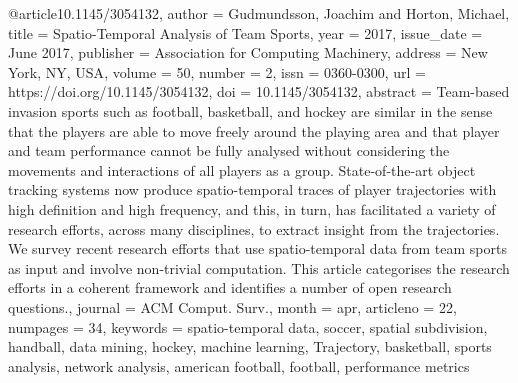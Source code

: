 @article{10.1145/3054132,
author = {Gudmundsson, Joachim and Horton, Michael},
title = {Spatio-Temporal Analysis of Team Sports},
year = {2017},
issue_date = {June 2017},
publisher = {Association for Computing Machinery},
address = {New York, NY, USA},
volume = {50},
number = {2},
issn = {0360-0300},
url = {https://doi.org/10.1145/3054132},
doi = {10.1145/3054132},
abstract = {Team-based invasion sports such as football, basketball, and hockey are similar in the sense that the players are able to move freely around the playing area and that player and team performance cannot be fully analysed without considering the movements and interactions of all players as a group. State-of-the-art object tracking systems now produce spatio-temporal traces of player trajectories with high definition and high frequency, and this, in turn, has facilitated a variety of research efforts, across many disciplines, to extract insight from the trajectories. We survey recent research efforts that use spatio-temporal data from team sports as input and involve non-trivial computation. This article categorises the research efforts in a coherent framework and identifies a number of open research questions.},
journal = {ACM Comput. Surv.},
month = apr,
articleno = {22},
numpages = {34},
keywords = {spatio-temporal data, soccer, spatial subdivision, handball, data mining, hockey, machine learning, Trajectory, basketball, sports analysis, network analysis, american football, football, performance metrics}
}